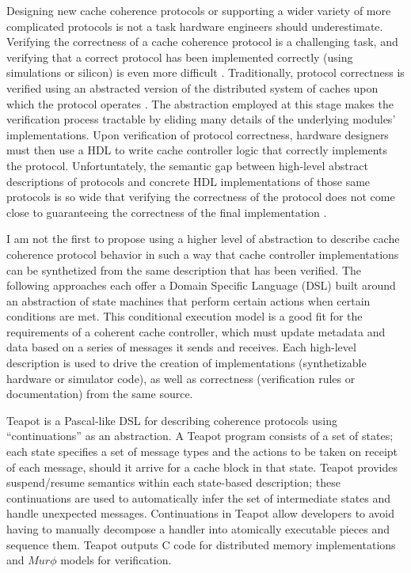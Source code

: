 Designing new cache coherence protocols or supporting a wider variety of more complicated protocols is not a task hardware engineers should underestimate.
Verifying the correctness of a cache coherence protocol is a challenging task, and
verifying that a correct protocol has been implemented correctly (using simulations or silicon) is even more difficult
\cite{deorio2008post, bentley2001validating, burckhardt2005verifying, clarke1995verification, dill1992protocol, wood1990verifying}.
Traditionally, protocol correctness is verified using an abstracted version of the distributed system of caches upon which the protocol operates
\cite{talupur2008going, delzanno2003constraint, pong1997verification, wood1990verifying, mcmillan2001parameterized}.
The abstraction employed at this stage makes the verification process tractable by eliding many details of the underlying modules' implementations.
Upon verification of protocol correctness, hardware designers must then use a HDL to write cache controller logic that correctly implements the protocol.
Unfortuntately, the semantic gap between high-level abstract descriptions of protocols and 
concrete HDL implementations of those same protocols is so wide that verifying the correctness of the protocol
does not come close to guaranteeing the correctness of the final implementation \cite{dave-memocode05}.

I am not the first to propose using a higher level of abstraction to describe cache coherence protocol behavior
in such a way that cache controller implementations can be synthetized from the same description that has been verified.
The following approaches each offer a Domain Specific Language (DSL)
built around an abstraction of state machines that perform certain actions when certain conditions are met.
This conditional execution model is a good fit for the requirements of a coherent cache controller,
which must update metadata and data based on a series of messages it sends and receives.
Each high-level description is used to drive the creation of implementations (synthetizable hardware or simulator code),
as well as correctness (verification rules or documentation) from the same source.

Teapot \cite{chandra-dsl97, chandra-sigplan96}
is a Pascal-like DSL for describing coherence protocols using ``continuations'' as an abstraction.
A Teapot program consists of a set of states; each state
specifies a set of message types and the actions to be
taken on receipt of each message, should it arrive for a
cache block in that state.
Teapot provides suspend/resume semantics within each state-based description;
these continuations are used to automatically infer the set of intermediate states and handle unexpected messages.
Continuations in Teapot allow developers to avoid having to manually decompose
a handler into atomically executable pieces and sequence them. 
Teapot outputs C code for distributed memory implementations and $Mur\phi$ models for verification.

